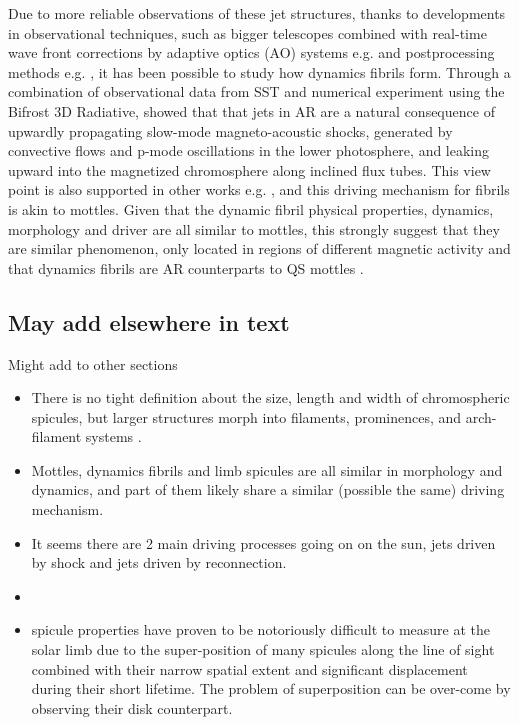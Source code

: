 \documentclass[12pt]{ociamthesis}
\begin{document}
\par Due to more reliable observations of these jet structures, thanks to developments in observational techniques, such as bigger telescopes combined with real-time wave front corrections by adaptive optics (AO) systems e.g. \citep{Scharmer2003SPIE4853370S,Rimmele2000SPIE4007218R} and postprocessing methods e.g. \citep{van2005SoPh228191V,von1993AA268374V}, it has been possible to study how dynamics fibrils form. Through a combination of observational data from SST and numerical experiment using the Bifrost 3D Radiative, \cite{Hansteen2006ApJ} showed that that jets in AR are a natural consequence of upwardly propagating slow-mode magneto-acoustic shocks, generated by convective flows and p-mode oscillations in the lower photosphere, and leaking upward into the magnetized chromosphere along inclined flux tubes. This view point is also supported in other works e.g. \citep{Heggland2007ApJ6661277H,De_Pontieu2007ApJ,Pontieu2004Natur,Suematsu1990LNP367211S}, and this driving mechanism for fibrils is akin to mottles. Given that the dynamic fibril physical properties, dynamics, morphology and driver are all similar to mottles, this strongly suggest that they are similar phenomenon, only located in regions of different magnetic activity and that dynamics fibrils are AR counterparts to QS mottles \citep{Rouppe2007ApJ660L169R}.
\subsection{May add elsewhere in text}
\par Might add to other sections
\begin{itemize}
\item There is no tight definition about the size, length and width of chromospheric spicules, but larger structures morph into filaments, prominences, and arch-filament systems \citep{Aschwanden2019ASSL}.
\item Mottles, dynamics fibrils and limb spicules are all similar in morphology and dynamics, and part of them likely share a similar (possible the same) driving mechanism. 
\item \citep{Tsiropoula2012}
\subitem It seems there are 2 main driving processes going on on the sun, jets driven by shock and jets driven by reconnection.
\item \cite{Sekse2013ApJ764164S}
\item  spicule properties have proven to be notoriously difficult to measure at the solar limb due to the super-position of many spicules along the line of sight combined with their narrow spatial extent and significant displacement during their short lifetime. The problem of superposition can be over-come by observing their disk counterpart.
\end{itemize}
\end{document}
